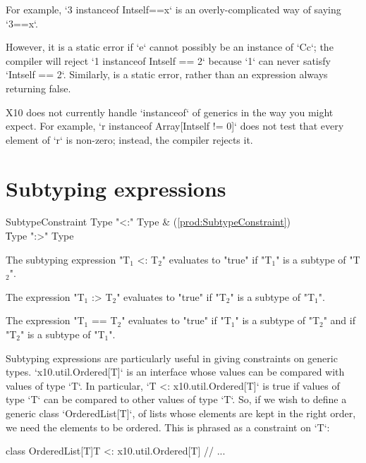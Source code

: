 For example, \xcd`3 instanceof Int{self==x}` is an overly-complicated way of
saying \xcd`3==x`.


However, it is a static error if \xcd`e` cannot possibly be an instance of
\xcd`C{c}`; the compiler will reject \xcd`1 instanceof Int{self == 2}` because
\xcd`1` can never satisfy \xcd`Int{self == 2}`. Similarly,  is a static error, rather than an expression always returning false. 

\limitationx
X10 does not currently handle \xcd`instanceof` of generics in the way you
might expect.  For example, \xcd`r instanceof Array[Int{self != 0}]` does
not test that every element of \xcd`r` is non-zero; instead, the compiler
rejects it.


\section{Subtyping expressions}
\index{\Xcd{<:}}
\index{\Xcd{:>}}


\begin{bbgrammar}
   SubtypeConstraint \: Type  \xcd"<:" Type  & (\ref{prod:SubtypeConstraint}) \\
                    \| Type  \xcd":>" Type  \\
\end{bbgrammar}

The subtyping expression \xcdmath"T$_1$ <: T$_2$" evaluates to \xcd"true" if
\xcdmath"T$_1$" is a subtype of \xcdmath"T$_2$".

The expression \xcdmath"T$_1$ :> T$_2$" evaluates to \xcd"true" if
\xcdmath"T$_2$" is a subtype of \xcdmath"T$_1$".

The expression \xcdmath"T$_1$ == T$_2$"
evaluates to  \xcd"true" if 
\xcdmath"T$_1$" is a subtype of \xcdmath"T$_2$" and
if \xcdmath"T$_2$" is a subtype of \xcdmath"T$_1$".

\begin{ex}
Subtyping expressions are particularly useful in giving constraints on generic
types.  \xcd`x10.util.Ordered[T]` is an interface whose values can be compared
with values of type \xcd`T`. 
In particular, \xcd`T <: x10.util.Ordered[T]` is
true if values of type \xcd`T` can be compared to other values of type
\xcd`T`.  So, if we wish to define a generic class \xcd`OrderedList[T]`, of
lists whose elements are kept in the right order, we need the elements to be
ordered.  This is phrased as a constraint on \xcd`T`: 
\begin{xten}
class OrderedList[T]{T <: x10.util.Ordered[T]} {
  // ...
}
\end{xten}
%
\end{ex}



